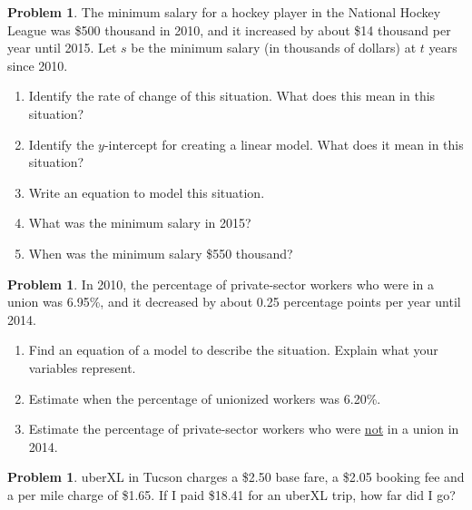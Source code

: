 \documentclass[11pt]{scrartcl}
\theoremstyle{definition}
\newtheorem{problem}[theorem]{Problem}
\begin{document}
\begin{problem}
	The minimum salary for a hockey player in the National Hockey League was \$500 thousand in 2010, and it increased by about \$14 thousand per year until 2015. Let $s$ be the minimum salary (in thousands of dollars) at $t$ years since 2010.
	\begin{enumerate}[label=\alph*)]
		\item Identify the rate of change of this situation. What does this mean in this situation?
		\item Identify the $y$-intercept for creating a linear model. What does it mean in this situation?
		\item Write an equation to model this situation.
		\item What was the minimum salary in 2015?
		\item When was the minimum salary \$550 thousand?
	\end{enumerate}
\end{problem}

\vspace{4mm}

\begin{problem}
	In 2010, the percentage of private-sector workers who were in a union was 6.95\%, and it decreased by about 0.25 percentage points per year until 2014.
	\begin{enumerate}[label=\alph*)]
		\item Find an equation of a model to describe the situation. Explain what your variables represent.
		\item Estimate when the percentage of unionized workers was 6.20\%.
		\item Estimate the percentage of private-sector workers who were \underline{not} in a union in 2014.
	\end{enumerate}
\end{problem}

\begin{problem}
	uberXL in Tucson charges a \$2.50 base fare, a \$2.05 booking fee and a per mile charge of \$1.65. If I paid \$18.41 for an uberXL trip, how far did I go?
\end{problem}

\vspace{4mm}
\end{document}
